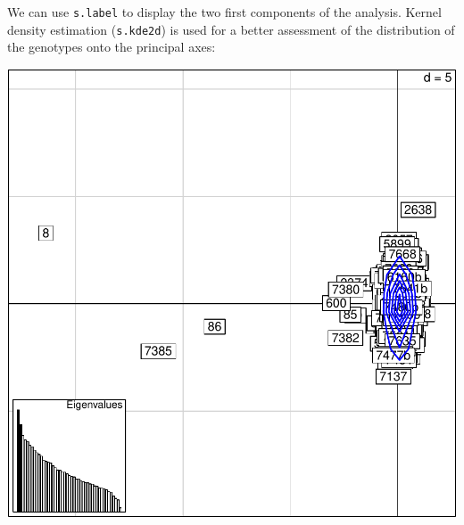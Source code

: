 \documentclass{article}
\begin{document}
We can use \texttt{s.label} to display the two first components of the analysis.
Kernel density estimation (\texttt{s.kde2d}) is used for a better
assessment of the distribution of the genotypes onto the principal axes:
\begin{Schunk}
\end{Schunk}
\includegraphics{figs/spca-034}
\end{document}
